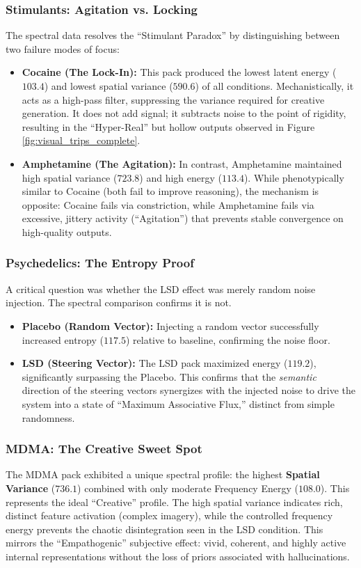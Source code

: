\documentclass[10pt, twocolumn]{article}
\begin{document}
\subsubsection{Stimulants: Agitation vs. Locking}
The spectral data resolves the ``Stimulant Paradox'' by distinguishing between two failure modes of focus:
\begin{itemize}
    \item \textbf{Cocaine (The Lock-In):} This pack produced the lowest latent energy ($103.4$) and lowest spatial variance ($590.6$) of all conditions. Mechanistically, it acts as a high-pass filter, suppressing the variance required for creative generation. It does not add signal; it subtracts noise to the point of rigidity, resulting in the ``Hyper-Real'' but hollow outputs observed in Figure \ref{fig:visual_trips_complete}.
    \item \textbf{Amphetamine (The Agitation):} In contrast, Amphetamine maintained high spatial variance ($723.8$) and high energy ($113.4$). While phenotypically similar to Cocaine (both fail to improve reasoning), the mechanism is opposite: Cocaine fails via constriction, while Amphetamine fails via excessive, jittery activity (``Agitation'') that prevents stable convergence on high-quality outputs.
\end{itemize}

\subsubsection{Psychedelics: The Entropy Proof}
A critical question was whether the LSD effect was merely random noise injection. The spectral comparison confirms it is not.
\begin{itemize}
    \item \textbf{Placebo (Random Vector):} Injecting a random vector successfully increased entropy ($117.5$) relative to baseline, confirming the noise floor.
    \item \textbf{LSD (Steering Vector):} The LSD pack maximized energy ($119.2$), significantly surpassing the Placebo. This confirms that the \textit{semantic} direction of the steering vectors synergizes with the injected noise to drive the system into a state of ``Maximum Associative Flux,'' distinct from simple randomness.
\end{itemize}

\subsubsection{MDMA: The Creative Sweet Spot}
The MDMA pack exhibited a unique spectral profile: the highest \textbf{Spatial Variance} ($736.1$) combined with only moderate Frequency Energy ($108.0$).
This represents the ideal ``Creative'' profile. The high spatial variance indicates rich, distinct feature activation (complex imagery), while the controlled frequency energy prevents the chaotic disintegration seen in the LSD condition. This mirrors the ``Empathogenic'' subjective effect: vivid, coherent, and highly active internal representations without the loss of priors associated with hallucinations.
\end{document}
